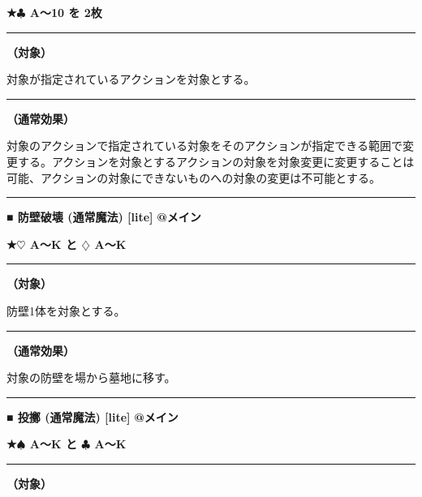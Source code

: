 \documentclass[twocolumn,a5paper,papersize,10pt]{jarticle}
\begin{document}
{\footnotesize\bf ★{\normalsize $\clubsuit$} A〜10 を 2枚}

\vspace{1mm}%
\hrule height 0.1mm depth 0mm width 66.5mm %
\vspace{1mm}%
{\bf（対象）}

対象が指定されているアクションを対象とする。
\vspace{1mm}%
\hrule height 0.1mm depth 0mm width 66.5mm %
\vspace{1mm}%

{\bf（通常効果）}

対象のアクションで指定されている対象をそのアクションが指定できる範囲で変更する。アクションを対象とするアクションの対象を対象変更に変更することは可能、アクションの対象にできないものへの対象の変更は不可能とする。
\vspace{2mm} %
\hrule height 0.5mm depth 0mm width 66.5mm %
\vspace{1mm} %
{\small\bf ■ 防壁破壊 {\scriptsize (通常魔法) [lite]}} %
\hfill 
{\footnotesize\bf @メイン }

{\footnotesize\bf ★{\normalsize $\heartsuit$} A〜K と {\normalsize $\diamondsuit$} A〜K}

\vspace{1mm}%
\hrule height 0.1mm depth 0mm width 66.5mm %
\vspace{1mm}%
{\bf（対象）}

防壁1体を対象とする。
\vspace{1mm}%
\hrule height 0.1mm depth 0mm width 66.5mm %
\vspace{1mm}%

{\bf（通常効果）}

対象の防壁を場から墓地に移す。
\vspace{2mm} %
\hrule height 0.5mm depth 0mm width 66.5mm %
\vspace{1mm} %
{\small\bf ■ 投擲 {\scriptsize (通常魔法) [lite]}} %
\hfill 
{\footnotesize\bf @メイン }

{\footnotesize\bf ★{\normalsize $\spadesuit$} A〜K と {\normalsize $\clubsuit$} A〜K}

\vspace{1mm}%
\hrule height 0.1mm depth 0mm width 66.5mm %
\vspace{1mm}%
{\bf（対象）}
\end{document}
